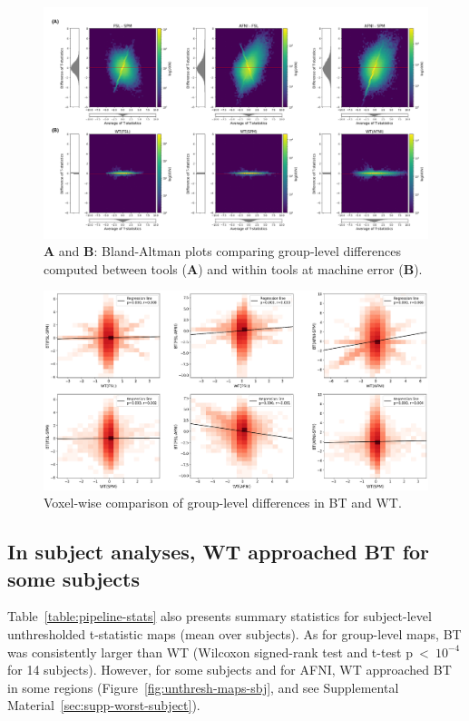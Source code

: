 \documentclass[11pt,onecolumn]{article}
\begin{document}
\begin{figure}[ht]
  \centering
    \includegraphics[width=.9\textwidth]{figures/plots/Bland-Altman/with-masking/unthresh-gl-frame.png}
  \caption{\textbf{A} and \textbf{B}: Bland-Altman plots comparing group-level differences computed between tools
    (\textbf{A}) and within tools at machine error (\textbf{B}).}%
  \label{fig:unthresh-maps}
\end{figure}

\begin{figure}[ht]
  \centering
  \includegraphics[width=.9\textwidth]{figures/rel-corr-unthresh-with-masking.png}
  \caption{Voxel-wise comparison of group-level differences in BT and WT.}
  \label{fig:unthresh-maps-corr}
\end{figure}

\subsection{In subject analyses, WT approached BT for some subjects}

Table~\ref{table:pipeline-stats} also presents summary statistics for
subject-level unthresholded t-statistic maps (mean over subjects).
As for group-level maps, BT was consistently larger than WT (Wilcoxon
signed-rank test and t-test p~\textless~$10^{-4}$ for 14 subjects).
However, for some subjects and for AFNI, WT approached 
BT in some regions (Figure~\ref{fig:unthresh-maps-sbj},
and see Supplemental Material~\ref{sec:supp-worst-subject}).
\end{document}
